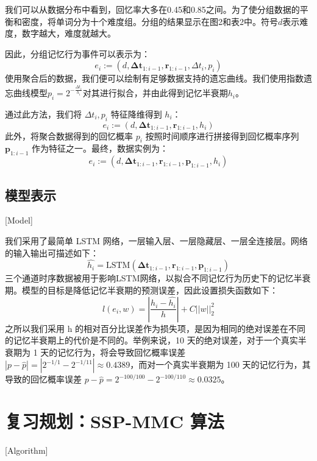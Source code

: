 我们可以从数据分布中看到，回忆率大多在0.45和0.85之间。为了使分组数据的平衡和密度，将单词分为十个难度组。分组的结果显示在图2和表2中。符号$d$表示难度，数字越大，难度就越大。

因此，分组记忆行为事件可以表示为：
\begin{equation}
e_{i} :=(d, \boldsymbol{\Delta t}_{1:i-1}, \boldsymbol r_{1:i-1}, \Delta t_i , p_i)
\end{equation}
使用聚合后的数据，我们便可以绘制有足够数据支持的遗忘曲线。我们使用指数遗忘曲线模型$p_i = 2^{-\frac{\Delta t_i}{h_i}}$对其进行拟合，并由此得到记忆半衰期$h_i$。

通过此方法，我们将 $\Delta t_i , p_i$ 特征降维得到 $h_i$：
\begin{equation}
e_{i} :=(d, \boldsymbol{\Delta t}_{1:i-1}, \boldsymbol r_{1:i-1}, h_i)
\end{equation}
此外，将聚合数据得到的回忆概率 $p_i$ 按照时间顺序进行拼接得到回忆概率序列 $\boldsymbol p_{1:i-1}$ 作为特征之一。最终，数据实例为：
\begin{equation}
e_{i}:=(d, \boldsymbol{\Delta t}_{1:i-1}, \boldsymbol r_{1:i-1}, \boldsymbol p_{1:i-1}, h_i)
\end{equation}

\subsection{模型表示}[Model]

我们采用了最简单 LSTM 网络，一层输入层、一层隐藏层、一层全连接层。网络的输入输出可描述如下：
\begin{equation}
\hat{h_i}=\mathrm{LSTM}(\boldsymbol{\Delta t}_{1:i-1}, \boldsymbol r_{1:i-1}, \boldsymbol p_{1:i-1})
\end{equation}
三个通道时序数据被用于影响LSTM网络，以拟合不同记忆行为历史下的记忆半衰期。模型的目标是降低记忆半衰期的预测误差，因此设置损失函数如下：
\begin{equation}
l(e_i,w)=|\frac{h_i-\hat{h_i}}{h}|+C||w||_{2}^{2}
\end{equation}
之所以我们采用 h 的相对百分比误差作为损失项，是因为相同的绝对误差在不同的记忆半衰期上的代价是不同的。举例来说，10 天的绝对误差，对于一个真实半衰期为 1 天的记忆行为，将会导致回忆概率误差 $|p-\hat{p}|=|2^{-1/1}-2^{-1/11}|\approx 0.4389$，而对一个真实半衰期为 100 天的记忆行为，其导致的回忆概率误差 $p-\hat{p}=2^{-100/100}-2^{-100/110}\approx 0.0325$。

\section{复习规划：SSP-MMC 算法}[Algorithm]

